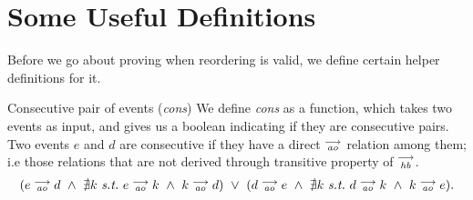 \section{Some Useful Definitions}
Before we go about proving when reordering is valid, we define certain helper definitions for it\footnotemark.


\begin{definition}{Consecutive pair of events (\emph{cons})}
    \label{Cons}
    We define \emph{cons} as a function, which takes two events as input, and gives us a boolean indicating if they are consecutive pairs. Two events $e$ and $d$ are consecutive if they have a direct $\stackrel{\longrightarrow}{_\textit{ao}}$ relation among them;  i.e those relations that are not derived through transitive property of $\stackrel{\longrightarrow}{_\textit{hb}}$. 
    \begin{align*}
        (
        e \stck{_\textit{ao}} d  \ \wedge \ 
        \nexists k \ \textit{s.t.} \ 
        e \stck{_\textit{ao}} k  \ \wedge \
        k \stck{_\textit{ao}} d 
        )
        \ \vee \
        (
            d \stck{_\textit{ao}} e  \ \wedge \ 
            \nexists k \ \textit{s.t.} \ 
            d \stck{_\textit{ao}} k  \ \wedge \
            k \stck{_\textit{ao}} e  
        ).
    \end{align*}
\end{definition}

